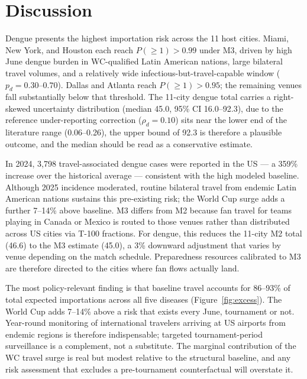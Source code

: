 \documentclass[12pt, a4paper]{article}
\begin{document}
\section{Discussion}

Dengue presents the highest importation risk across the 11 host cities. Miami, New York, and Houston each reach $P(\geq 1) > 0.99$ under M3, driven by high June dengue burden in WC-qualified Latin American nations, large bilateral travel volumes, and a relatively wide infectious-but-travel-capable window ($p_d = 0.30$--$0.70$). Dallas and Atlanta reach $P(\geq 1) > 0.95$; the remaining venues fall substantially below that threshold. The 11-city dengue total carries a right-skewed uncertainty distribution (median 45.0, 95\% CI 16.0--92.3), due to the reference under-reporting correction ($\rho_d = 0.10$) sits near the lower end of the literature range (0.06--0.26), the upper bound of 92.3 is therefore a plausible outcome, and the median should be read as a conservative estimate.

In 2024, 3,798 travel-associated dengue cases were reported in the US --- a 359\% increase over the historical average \citep{Kiplagat2026dengue} --- consistent with the high modeled baseline. Although 2025 incidence moderated, routine bilateral travel from endemic Latin American nations sustains this pre-existing risk; the World Cup surge adds a further 7--14\% above baseline. M3 differs from M2 because fan travel for teams playing in Canada or Mexico is routed to those venues rather than distributed across US cities via T-100 fractions. For dengue, this reduces the 11-city M2 total (46.6) to the M3 estimate (45.0), a 3\% downward adjustment that varies by venue depending on the match schedule. Preparedness resources calibrated to M3 are therefore directed to the cities where fan flows actually land.

The most policy-relevant finding is that baseline travel accounts for 86--93\% of total expected importations across all five diseases (Figure~\ref{fig:excess}). The World Cup adds 7--14\% above a risk that exists every June, tournament or not. Year-round monitoring of international travelers arriving at US airports from endemic regions is therefore indispensable; targeted tournament-period surveillance is a complement, not a substitute. The marginal contribution of the WC travel surge is real but modest relative to the structural baseline, and any risk assessment that  excludes a pre-tournament counterfactual will overstate it.
\end{document}
